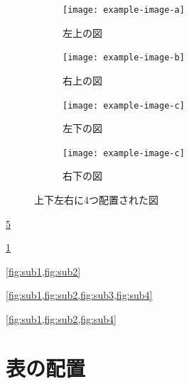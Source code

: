 \begin{figure}[tp]
    \centering
    \begin{subfigure}{0.45\textwidth}
        \centering
        \texttt{[image: example-image-a]}
        \caption{左上の図}
        \label{fig:sub1}
    \end{subfigure}
    \hfill %
    \begin{subfigure}{0.45\textwidth}
        \centering
        \texttt{[image: example-image-b]}
        \caption{右上の図}
        \label{fig:sub2}
    \end{subfigure}
    
    \vspace{5mm} %
    
    \begin{subfigure}[b]{0.45\textwidth}
        \centering
        \texttt{[image: example-image-c]}
        \caption{左下の図}
        \label{fig:sub3}
    \end{subfigure}
    \hfill %
    \begin{subfigure}[b]{0.45\textwidth}
        \centering
        \texttt{[image: example-image-c]}
        \caption{右下の図}
        \label{fig:sub4}
    \end{subfigure}
    \caption{上下左右に4つ配置された図}
    \label{fig:four_subfigures}
\end{figure}


\ref{fig:four_subfigures}

\ref{fig:sub1}




\cref{fig:sub1,fig:sub2}

\cref{fig:sub1,fig:sub2,fig:sub3,fig:sub4}

\cref{fig:sub1,fig:sub2,fig:sub4}


\section{表の配置}
\label{sec:table}




